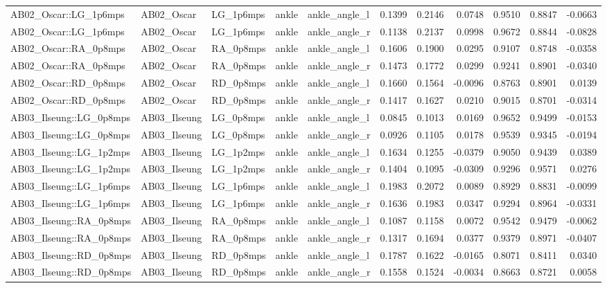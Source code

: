 \begin{table}
\begin{tabular}{lllllrrrrrr}
AB02_Oscar::LG_1p6mps & AB02_Oscar & LG_1p6mps & ankle & ankle_angle_l & 0.1399 & 0.2146 & 0.0748 & 0.9510 & 0.8847 & -0.0663 \\
AB02_Oscar::LG_1p6mps & AB02_Oscar & LG_1p6mps & ankle & ankle_angle_r & 0.1138 & 0.2137 & 0.0998 & 0.9672 & 0.8844 & -0.0828 \\
AB02_Oscar::RA_0p8mps & AB02_Oscar & RA_0p8mps & ankle & ankle_angle_l & 0.1606 & 0.1900 & 0.0295 & 0.9107 & 0.8748 & -0.0358 \\
AB02_Oscar::RA_0p8mps & AB02_Oscar & RA_0p8mps & ankle & ankle_angle_r & 0.1473 & 0.1772 & 0.0299 & 0.9241 & 0.8901 & -0.0340 \\
AB02_Oscar::RD_0p8mps & AB02_Oscar & RD_0p8mps & ankle & ankle_angle_l & 0.1660 & 0.1564 & -0.0096 & 0.8763 & 0.8901 & 0.0139 \\
AB02_Oscar::RD_0p8mps & AB02_Oscar & RD_0p8mps & ankle & ankle_angle_r & 0.1417 & 0.1627 & 0.0210 & 0.9015 & 0.8701 & -0.0314 \\
AB03_Ilseung::LG_0p8mps & AB03_Ilseung & LG_0p8mps & ankle & ankle_angle_l & 0.0845 & 0.1013 & 0.0169 & 0.9652 & 0.9499 & -0.0153 \\
AB03_Ilseung::LG_0p8mps & AB03_Ilseung & LG_0p8mps & ankle & ankle_angle_r & 0.0926 & 0.1105 & 0.0178 & 0.9539 & 0.9345 & -0.0194 \\
AB03_Ilseung::LG_1p2mps & AB03_Ilseung & LG_1p2mps & ankle & ankle_angle_l & 0.1634 & 0.1255 & -0.0379 & 0.9050 & 0.9439 & 0.0389 \\
AB03_Ilseung::LG_1p2mps & AB03_Ilseung & LG_1p2mps & ankle & ankle_angle_r & 0.1404 & 0.1095 & -0.0309 & 0.9296 & 0.9571 & 0.0276 \\
AB03_Ilseung::LG_1p6mps & AB03_Ilseung & LG_1p6mps & ankle & ankle_angle_l & 0.1983 & 0.2072 & 0.0089 & 0.8929 & 0.8831 & -0.0099 \\
AB03_Ilseung::LG_1p6mps & AB03_Ilseung & LG_1p6mps & ankle & ankle_angle_r & 0.1636 & 0.1983 & 0.0347 & 0.9294 & 0.8964 & -0.0331 \\
AB03_Ilseung::RA_0p8mps & AB03_Ilseung & RA_0p8mps & ankle & ankle_angle_l & 0.1087 & 0.1158 & 0.0072 & 0.9542 & 0.9479 & -0.0062 \\
AB03_Ilseung::RA_0p8mps & AB03_Ilseung & RA_0p8mps & ankle & ankle_angle_r & 0.1317 & 0.1694 & 0.0377 & 0.9379 & 0.8971 & -0.0407 \\
AB03_Ilseung::RD_0p8mps & AB03_Ilseung & RD_0p8mps & ankle & ankle_angle_l & 0.1787 & 0.1622 & -0.0165 & 0.8071 & 0.8411 & 0.0340 \\
AB03_Ilseung::RD_0p8mps & AB03_Ilseung & RD_0p8mps & ankle & ankle_angle_r & 0.1558 & 0.1524 & -0.0034 & 0.8663 & 0.8721 & 0.0058 \\

\end{tabular}
\end{table}
